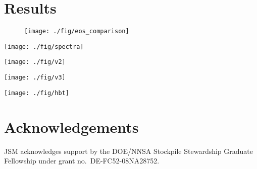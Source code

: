 \documentclass[aps,prc,reprint,amsmath,nofootinbib,superscriptaddress]{revtex4-1}
\begin{document}
\section{Results}

\begin{figure}[t]
  \texttt{[image: ./fig/eos\_comparison]}
  \caption{
    \label{fig:spectra}
  }
\end{figure}

\begin{figure*}[t]
  \texttt{[image: ./fig/spectra]}
  \caption{
    \label{fig:spectra}
  }
\end{figure*}

\begin{figure*}[t]
  \texttt{[image: ./fig/v2]}
  \caption{
    \label{fig:spectra}
  }
\end{figure*}

\begin{figure*}[t]
  \texttt{[image: ./fig/v3]}
  \caption{
    \label{fig:spectra}
  }
\end{figure*}

\begin{figure*}[t]
  \texttt{[image: ./fig/hbt]}
  \caption{
    \label{fig:spectra}
  }
\end{figure*}


\section{Acknowledgements}

\medskip
JSM acknowledges support by the DOE/NNSA Stockpile Stewardship Graduate Fellowship under grant no.~DE-FC52-08NA28752.

%
\end{document}
